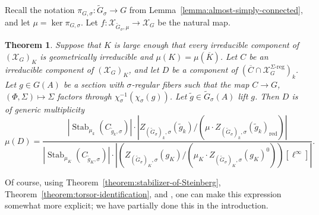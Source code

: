 \documentclass[11pt,reqno]{amsart}
\newtheorem{theorem}{Theorem}[section]
\theoremstyle{definition}
\renewcommand{\rm}{\mathrm}
\newcommand{\sX}{{\mathscr X}}
\DeclareMathOperator{\Stab}{Stab}
\newcommand{\ov}[1]{\overline{#1}}
\begin{document}
Recall the notation $\pi_{G,\sigma}\colon \widetilde{G}_\sigma \to G$ from Lemma~\ref{lemma:almost-simply-connected}, and let $\mu = \ker \pi_{G,\sigma}$. Let $f\colon \sX_{\widetilde{G}_\sigma, \mu} \to \sX_G$ be the natural map.

\begin{theorem}\label{theorem:l-param-mult}
    Suppose that $K$ is large enough that every irreducible component of $(\sX_G)_K$ is geometrically irreducible and $\mu(K) = \mu(\ov{K})$. Let $C$ be an irreducible component of $(\sX_G)_K$, and let $D$ be a component of $(\ov{C} \cap \sX_G^{\Sigma\textrm{-}\rm{reg}})_k$. Let $g \in G(A)$ be a section with $\sigma$-regular fibers such that the map $C \to G$, $(\Phi, \Sigma) \mapsto \Sigma$ factors through $\chi_\sigma^{-1}(\chi_\sigma(g))$. Let $\widetilde{g} \in \widetilde{G}_\sigma(A)$ lift $g$. Then $D$ is of generic multiplicity
        \[
        \mu(D) = \frac{|\Stab_{\mu_k}(C_{\widetilde{g}_k,\sigma})| \cdot |Z_{(\widetilde{G}_\sigma)_k,\sigma}(\widetilde{g}_k)/(\mu \cdot Z_{(\widetilde{G}_\sigma)_k,\sigma}(\widetilde{g}_k)_{\rm{red}})|}{|\Stab_{\mu_K}(C_{\widetilde{g}_K,\sigma})| \cdot |(Z_{(\widetilde{G}_\sigma)_K,\sigma}(g_K)/(\mu_K \cdot Z_{(\widetilde{G}_\sigma)_K,\sigma}(g_K)^0))[\ell^\infty]|}.
        \]
\end{theorem}

Of course, using Theorem~\ref{theorem:stabilizer-of-Steinberg}, Theorem~\ref{theorem:torsor-identification}, and \cite[Theorem 9.1(a)]{SteinbergEndomorphisms}, one can make this expression somewhat more explicit; we have partially done this in the introduction.
\end{document}
